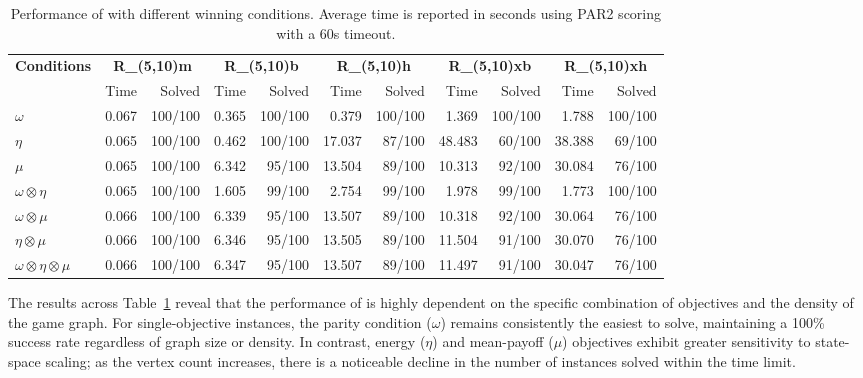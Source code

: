\documentclass[a4paper,UKenglish,cleveref, autoref, thm-restate]{lipics-v2021}
\begin{document}
\vspace{-8pt}
\begin{table}[ht]
\centering
\caption{Performance of \nocq with different winning conditions. Average time is reported in seconds using PAR2 scoring with a 60s timeout.}
\setlength{\tabcolsep}{0.9mm} %
{\small 
\begin{tabular}{l|rr|rr|rr|rr|rr}
\toprule
\textbf{Conditions} & \multicolumn{2}{c|}{\textbf{R\_(5,10)m}} & \multicolumn{2}{c|}{\textbf{R\_(5,10)b}} & \multicolumn{2}{c|}{\textbf{R\_(5,10)h}} & \multicolumn{2}{c|}{\textbf{R\_(5,10)xb}} & \multicolumn{2}{c}{\textbf{R\_(5,10)xh}} \\
& Time & Solved & Time & Solved & Time & Solved & Time & Solved & Time & Solved \\
\midrule
\textbf{$\omega$}
    & 0.067 & 100/100 & 0.365 & 100/100 & 0.379 & 100/100 & 1.369 & 100/100 & 1.788 & 100/100 \\
\textbf{$\eta$}
    & 0.065 & 100/100 & 0.462 & 100/100 & 17.037 & 87/100 & 48.483 & 60/100 & 38.388 & 69/100 \\
\textbf{$\mu$}
    & 0.065 & 100/100 & 6.342 & 95/100 & 13.504 & 89/100 & 10.313 & 92/100 & 30.084 & 76/100 \\
\textbf{$\omega \otimes \eta$}
    & 0.065 & 100/100 & 1.605 & 99/100 & 2.754 & 99/100 & 1.978 & 99/100 & 1.773 & 100/100 \\
\textbf{$\omega \otimes \mu$}
    & 0.066 & 100/100 & 6.339 & 95/100 & 13.507 & 89/100 & 10.318 & 92/100 & 30.064 & 76/100 \\
\textbf{$\eta \otimes \mu$}
    & 0.066 & 100/100 & 6.346 & 95/100 & 13.505 & 89/100 & 11.504 & 91/100 & 30.070 & 76/100 \\
\textbf{$\omega \otimes \eta \otimes \mu$}
    & 0.066 & 100/100 & 6.347 & 95/100 & 13.507 & 89/100 & 11.497 & 91/100 & 30.047 & 76/100 \\
\bottomrule
\end{tabular}
}
\label{tab:quantitative}
\end{table}
\vspace{-5pt}

The results across Table~\ref{tab:quantitative} reveal that the performance of \nocq is highly dependent on the specific combination of objectives and the density of the game graph. For single-objective instances, the parity condition ($\omega$) remains consistently the easiest to solve, maintaining a 100\% success rate regardless of graph size or density. In contrast, energy ($\eta$) and mean-payoff ($\mu$) objectives exhibit greater sensitivity to state-space scaling; as the vertex count increases, there is a noticeable decline in the number of instances solved within the time limit.
\end{document}
